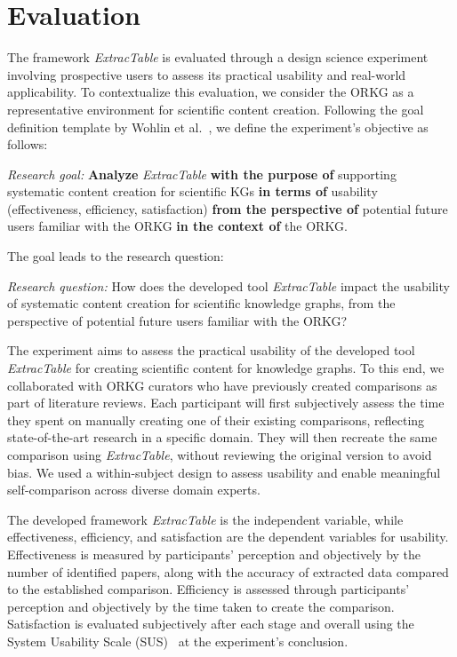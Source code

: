 \documentclass[runningheads]{llncs}
\begin{document}
\section{Evaluation\label{sec:evaluation}}
The framework \textit{ExtracTable} is evaluated through a design science experiment involving prospective users to assess its practical usability and real-world applicability. To contextualize this evaluation, we consider the ORKG as a representative environment for scientific content creation. Following the goal definition template by Wohlin et al.~\cite{wohlin_experimentation_2012}, we define the experiment’s objective as follows:

\begin{mdframed}
\textit{Research goal:} \textbf{Analyze} \textit{ExtracTable}
\textbf{with the purpose of} supporting systematic content creation for scientific KGs
\textbf{in terms of} usability (effectiveness, efficiency, satisfaction)
\textbf{from the perspective of} potential future users familiar with the ORKG
\textbf{in the context of} the ORKG.
\end{mdframed}
The goal leads to the research question:
\begin{mdframed}
    \textit{Research question:} How does the developed tool \textit{ExtracTable} impact the usability of systematic content creation for scientific knowledge graphs, from the perspective of potential future users familiar with the ORKG?
\end{mdframed}
\noindent The experiment aims to assess the practical usability of the developed tool \textit{ExtracTable} for creating scientific content for knowledge graphs. To this end, we collaborated with ORKG curators who have previously created comparisons as part of literature reviews. Each participant will first subjectively assess the time they spent on manually creating one of their existing comparisons, reflecting state-of-the-art research in a specific domain. They will then recreate the same comparison using \textit{ExtracTable}, without reviewing the original version to avoid bias. We used a within-subject design to assess usability and enable meaningful self-comparison across diverse domain experts.

The developed framework \textit{ExtracTable} is the independent variable, while effectiveness, efficiency, and satisfaction are the dependent variables for usability. Effectiveness is measured by participants' perception and objectively by the number of identified papers, along with the accuracy of extracted data compared to the established comparison. 
Efficiency is assessed through participants' perception and objectively by the time taken to create the comparison.
Satisfaction is evaluated subjectively after each stage and overall using the System Usability Scale (SUS)~\cite{lewis_item_2018} at the experiment's conclusion.
\end{document}
